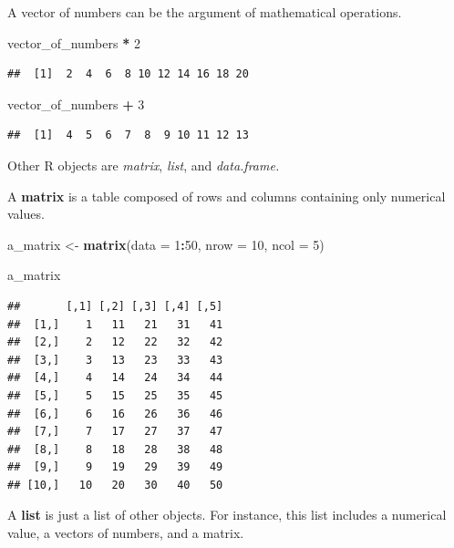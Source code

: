 \documentclass[
]{article}
\newenvironment{Shaded}{\begin{snugshade}}{\end{snugshade}}
\newcommand{\DataTypeTok}[1]{\textcolor[rgb]{0.13,0.29,0.53}{#1}}
\newcommand{\DecValTok}[1]{\textcolor[rgb]{0.00,0.00,0.81}{#1}}
\newcommand{\KeywordTok}[1]{\textcolor[rgb]{0.13,0.29,0.53}{\textbf{#1}}}
\newcommand{\NormalTok}[1]{#1}
\newcommand{\OperatorTok}[1]{\textcolor[rgb]{0.81,0.36,0.00}{\textbf{#1}}}
\newcommand{\StringTok}[1]{\textcolor[rgb]{0.31,0.60,0.02}{#1}}
\begin{document}
A vector of numbers can be the argument of mathematical operations.

\begin{Shaded}
\begin{Highlighting}[]
\NormalTok{vector_of_numbers }\OperatorTok{*}\StringTok{ }\DecValTok{2}
\end{Highlighting}
\end{Shaded}

\begin{verbatim}
##  [1]  2  4  6  8 10 12 14 16 18 20
\end{verbatim}

\begin{Shaded}
\begin{Highlighting}[]
\NormalTok{vector_of_numbers }\OperatorTok{+}\StringTok{ }\DecValTok{3}
\end{Highlighting}
\end{Shaded}

\begin{verbatim}
##  [1]  4  5  6  7  8  9 10 11 12 13
\end{verbatim}

Other R objects are \emph{matrix}, \emph{list}, and \emph{data.frame.}

A \textbf{matrix} is a table composed of rows and columns containing only numerical values.

\begin{Shaded}
\begin{Highlighting}[]
\NormalTok{a_matrix <-}\StringTok{ }\KeywordTok{matrix}\NormalTok{(}\DataTypeTok{data =} \DecValTok{1}\OperatorTok{:}\DecValTok{50}\NormalTok{, }\DataTypeTok{nrow =} \DecValTok{10}\NormalTok{, }\DataTypeTok{ncol =} \DecValTok{5}\NormalTok{)}

\NormalTok{a_matrix}
\end{Highlighting}
\end{Shaded}

\begin{verbatim}
##       [,1] [,2] [,3] [,4] [,5]
##  [1,]    1   11   21   31   41
##  [2,]    2   12   22   32   42
##  [3,]    3   13   23   33   43
##  [4,]    4   14   24   34   44
##  [5,]    5   15   25   35   45
##  [6,]    6   16   26   36   46
##  [7,]    7   17   27   37   47
##  [8,]    8   18   28   38   48
##  [9,]    9   19   29   39   49
## [10,]   10   20   30   40   50
\end{verbatim}

A \textbf{list} is just a list of other objects.
For instance, this list includes a numerical value, a vectors of numbers, and a matrix.
\end{document}
